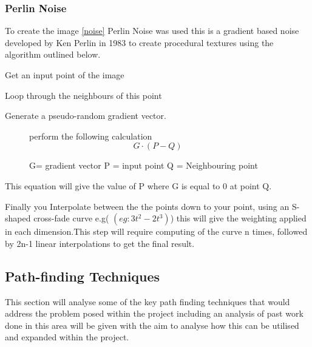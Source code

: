 \subsubsection{Perlin Noise}
\label{Perlin}
To create the image \ref{noise} Perlin Noise was used this is a gradient based noise developed by Ken Perlin in 1983 \cite{perlin} to create procedural textures using the algorithm outlined below. 
\begin{itemize}
\item Get an input point of the image 
\item Loop through the neighbours of this point
\item Generate a pseudo-random gradient vector.
\begin{figure}[h]
\centering
\item perform the following calculation
\begin{equation}
\label{eq:Noise}
G \cdot(P-Q)
\end{equation}
\caption{G= gradient vector P = input point Q = Neighbouring point}
\label{noise:eq}
\end{figure}

This equation will give the value of P where G is equal to 0 at point Q.
\item Finally you Interpolate between the the points down to your point, using an S-shaped cross-fade curve e.g( 
\begin{math}(eg: 3t^2-2t^3)\end{math}) this will give the weighting applied in each dimension.This step will require computing of the curve n times, followed by 2n-1 linear interpolations to get the final result.
\end{itemize}

\subsection{Path-finding Techniques}
This section will analyse some of the key path finding techniques that would address the problem posed within the project including an analysis of past work done in this area will be given with the aim to analyse how this can be utilised and expanded within the project. 
